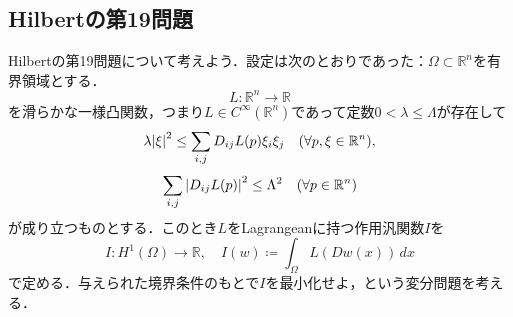 \documentclass[a4paper]{ltjsarticle}
\newcommand{\Rset}{\mathbb{R}}
\newcommand{\Om}{\Omega}
\newcommand{\1}{\mathbbm{1}}
\numberwithin{equation}{section}
\theoremstyle{definition}
\begin{document}
\subsection{Hilbertの第19問題}
Hilbertの第19問題について考えよう．設定は次のとおりであった：$\Om\subset \Rset^n$を有界領域とする．
\begin{equation}
    L\colon \Rset^n\to\Rset 
\end{equation}
を滑らかな一様凸関数，つまり$L\in C^{\infty}(\Rset^n)$であって定数$0<\lambda\leq \Lambda$が存在して
\begin{equation}
    \lambda\abs{\xi}^2\leq \sum_{i,j}D_{ij}L(p)\xi_i\xi_j\quad (\forall p,\xi\in\Rset^n),
\end{equation}
\begin{equation}
    \sum_{i,j}\abs{D_{ij}L(p)}^2\leq \Lambda^2 \quad (\forall p\in\Rset^n)
\end{equation}
が成り立つものとする．このとき$L$をLagrangeanに持つ作用汎関数$I$を
\begin{equation}
    I\colon H^1(\Om)\to \Rset,\quad I(w)\coloneqq \int_{\Om}L(Dw(x))\,dx 
\end{equation}
で定める．与えられた境界条件のもとで$I$を最小化せよ，という変分問題を考える．
\end{document}
